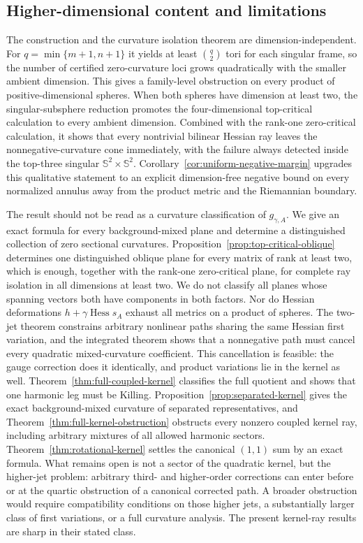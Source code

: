 \documentclass[11pt]{amsart}
\theoremstyle{definition}
\theoremstyle{remark}
\DeclareMathOperator{\Hess}{Hess}
\newcommand{\Sph}{\mathbb S}
\begin{document}
\subsection{Higher-dimensional content and limitations}

The construction and the curvature isolation theorem are
dimension-independent.  For
$q=\min\{m+1,n+1\}$ it yields at least $\binom q2$ tori for each
singular frame, so the number of certified zero-curvature loci grows
quadratically with the smaller ambient dimension.  This gives a
family-level obstruction on every product of positive-dimensional
spheres.  When both spheres have dimension at least two, the
singular-subsphere reduction promotes the four-dimensional
top-critical calculation to every ambient dimension.  Combined with
the rank-one zero-critical calculation, it shows that every
nontrivial bilinear Hessian ray leaves the nonnegative-curvature cone
immediately, with the failure always detected inside the top-three singular
$\Sph^2\times\Sph^2$.  Corollary~\ref{cor:uniform-negative-margin}
upgrades this qualitative statement to an explicit dimension-free
negative bound on every normalized annulus away from the product
metric and the Riemannian boundary.

The result should not be read as a curvature classification of
$g_{\gamma,A}$.  We give an exact formula for every background-mixed
plane and determine a distinguished collection of zero sectional
curvatures.  Proposition~\ref{prop:top-critical-oblique} determines
one distinguished oblique plane for every matrix of rank at least two,
which is enough, together with the rank-one zero-critical plane, for
complete ray isolation in all dimensions at least two.  We do not
classify all planes whose spanning vectors both have components in
both factors.
Nor do Hessian deformations $h+\gamma\Hess s_A$ exhaust all metrics on
a product of spheres.  The two-jet theorem constrains arbitrary
nonlinear paths sharing the same Hessian first variation, and the
integrated theorem shows that a nonnegative path must cancel every
quadratic mixed-curvature coefficient.  This cancellation is feasible:
the gauge correction does it identically, and product variations lie
in the kernel as well.  Theorem~\ref{thm:full-coupled-kernel}
classifies the full quotient and shows that one harmonic leg must be
Killing.  Proposition~\ref{prop:separated-kernel} gives the exact
background-mixed curvature of separated representatives, and
Theorem~\ref{thm:full-kernel-obstruction} obstructs every nonzero
coupled kernel ray, including arbitrary mixtures of all allowed
harmonic sectors.
Theorem~\ref{thm:rotational-kernel} settles the canonical $(1,1)$ sum
by an exact formula.  What remains open is not a sector of the
quadratic kernel, but the higher-jet problem: arbitrary third- and
higher-order corrections can enter before or at the quartic
obstruction of a canonical corrected path.  A broader obstruction
would require compatibility conditions on those higher jets, a
substantially larger class of first variations, or a full curvature
analysis.  The present kernel-ray results are sharp in their stated
class.
\end{document}
